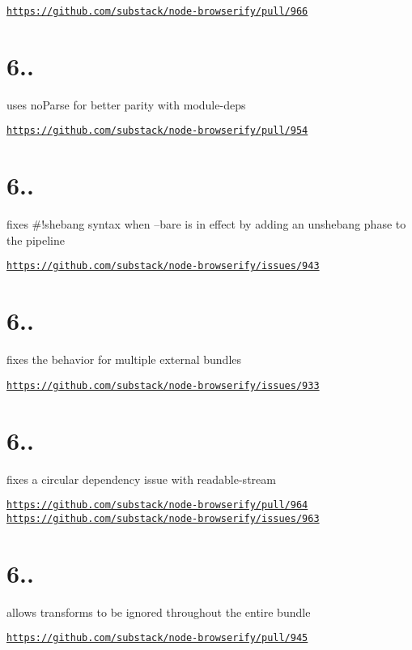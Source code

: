 \href{https://github.com/substack/node-browserify/pull/966}{\tt https\+://github.\+com/substack/node-\/browserify/pull/966}

\section*{6..}

uses no\+Parse for better parity with module-\/deps

\href{https://github.com/substack/node-browserify/pull/954}{\tt https\+://github.\+com/substack/node-\/browserify/pull/954}

\section*{6..}

fixes \#!shebang syntax when --bare is in effect by adding an unshebang phase to the pipeline

\href{https://github.com/substack/node-browserify/issues/943}{\tt https\+://github.\+com/substack/node-\/browserify/issues/943}

\section*{6..}

fixes the behavior for multiple external bundles

\href{https://github.com/substack/node-browserify/issues/933}{\tt https\+://github.\+com/substack/node-\/browserify/issues/933}

\section*{6..}

fixes a circular dependency issue with readable-\/stream

\href{https://github.com/substack/node-browserify/pull/964}{\tt https\+://github.\+com/substack/node-\/browserify/pull/964} \href{https://github.com/substack/node-browserify/issues/963}{\tt https\+://github.\+com/substack/node-\/browserify/issues/963}

\section*{6..}

allows transforms to be ignored throughout the entire bundle

\href{https://github.com/substack/node-browserify/pull/945}{\tt https\+://github.\+com/substack/node-\/browserify/pull/945}

